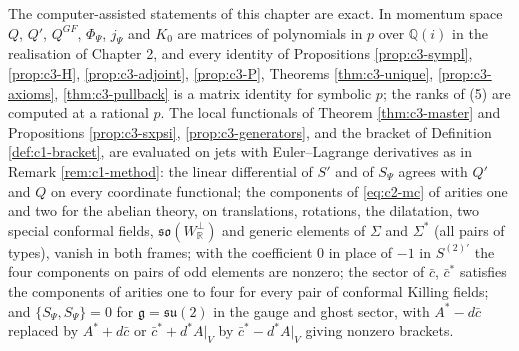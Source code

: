 \begin{remark}
\label{rem:c3-method}
The computer-assisted statements of this chapter are exact. In momentum space $Q$, $Q'$, $Q^{GF}$, $\Phi_\Psi$, $j_\Psi$ and $K_0$ are matrices of polynomials in $p$ over $\mathbb Q(i)$ in the realisation of Chapter 2, and every identity of Propositions \ref{prop:c3-sympl}, \ref{prop:c3-H}, \ref{prop:c3-adjoint}, \ref{prop:c3-P}, Theorems \ref{thm:c3-unique}, \ref{prop:c3-axioms}, \ref{thm:c3-pullback} is a matrix identity for symbolic $p$; the ranks of (5) are computed at a rational $p$. The local functionals of Theorem \ref{thm:c3-master} and Propositions \ref{prop:c3-sxpsi}, \ref{prop:c3-generators}, and the bracket of Definition \ref{def:c1-bracket}, are evaluated on jets with Euler--Lagrange derivatives as in Remark \ref{rem:c1-method}: the linear differential of $S'$ and of $S_\Psi$ agrees with $Q'$ and $Q$ on every coordinate functional; the components of \eqref{eq:c2-mc} of arities one and two for the abelian theory, on translations, rotations, the dilatation, two special conformal fields, $\mathfrak{so}(W_{\mathbb R}^\perp)$ and generic elements of $\Sigma$ and $\Sigma^*$ (all pairs of types), vanish in both frames; with the coefficient $0$ in place of $-1$ in $S^{(2)\prime}$ the four components on pairs of odd elements are nonzero; the sector of $\bar c$, $\bar c^*$ satisfies the components of arities one to four for every pair of conformal Killing fields; and $\{S_\Psi,S_\Psi\}=0$ for $\mathfrak g=\mathfrak{su}(2)$ in the gauge and ghost sector, with $A^*-d\bar c$ replaced by $A^*+d\bar c$ or $\bar c^*+d^*A|_V$ by $\bar c^*-d^*A|_V$ giving nonzero brackets.
\end{remark}


